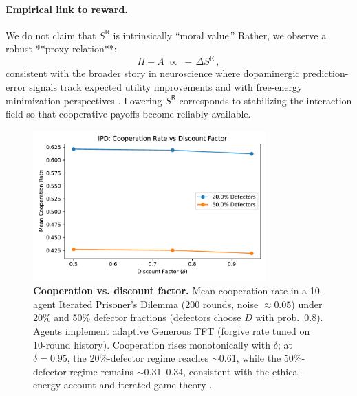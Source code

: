 \documentclass[11pt,a4paper]{article}
\begin{document}
\paragraph{Empirical link to reward.}
We do not claim that $S^{\mathsf{R}}$ is intrinsically “moral value.” Rather, we observe a robust **proxy relation**:
\[
H - A \;\propto\; -\,\Delta S^{\mathsf{R}}\,,
\]
consistent with the broader story in neuroscience where dopaminergic prediction-error signals track expected utility improvements \cite{Schultz1998} and with free-energy minimization perspectives \cite{Friston2010}. Lowering $S^{\mathsf{R}}$ corresponds to stabilizing the interaction field so that cooperative payoffs become reliably available.

\begin{figure}[t]
  \centering
  \includegraphics[width=0.80\textwidth]{ipd_chart.pdf}
  \caption{\textbf{Cooperation vs. discount factor.}
  Mean cooperation rate in a 10-agent Iterated Prisoner’s Dilemma (200 rounds, noise $\approx 0.05$) under 20\% and 50\% defector fractions (defectors choose $D$ with prob.\ 0.8). Agents implement adaptive Generous TFT (forgive rate tuned on 10-round history). Cooperation rises monotonically with $\delta$; at $\delta{=}0.95$, the 20\%-defector regime reaches $\sim$0.61, while the 50\%-defector regime remains $\sim$0.31–0.34, consistent with the ethical-energy account and iterated-game theory \cite{Axelrod1984,Nowak2006}.}
  \label{fig:ipd}
\end{figure}
\end{document}
